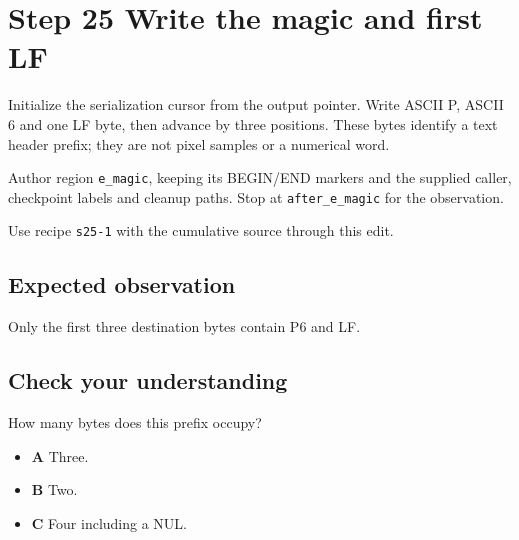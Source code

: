 \section{Step 25 Write the magic and first LF}\label{ppm-s25}

Initialize the serialization cursor from the output pointer. Write ASCII P, ASCII 6 and one LF byte, then advance by three positions. These bytes identify a text header prefix; they are not pixel samples or a numerical word.

Author region \texttt{e\_magic}, keeping its BEGIN/END markers and the supplied caller, checkpoint labels and cleanup paths. Stop at \texttt{after\_e\_magic} for the observation.

Use recipe \texttt{s25-1} with the cumulative source through this edit.

\subsection{Expected observation}
Only the first three destination bytes contain P6 and LF.

\subsection{Check your understanding}
How many bytes does this prefix occupy?

\begin{itemize}
\item \textbf{A} Three.
\item \textbf{B} Two.
\item \textbf{C} Four including a NUL.
\end{itemize}
